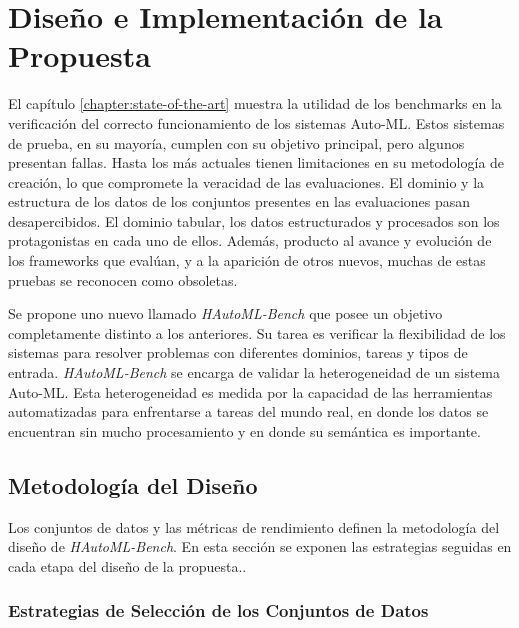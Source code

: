 \chapter{Diseño e Implementación de la Propuesta}\label{chapter:design}


El capítulo \ref{chapter:state-of-the-art} muestra la utilidad de los benchmarks en la verificación del correcto funcionamiento de los sistemas Auto-ML.
Estos sistemas de prueba, en su mayoría, cumplen con su objetivo principal, pero algunos presentan fallas. Hasta los más actuales 
tienen limitaciones en su metodología de creación, lo que compromete la veracidad de las evaluaciones. 
El dominio y la estructura de los datos de los conjuntos presentes en las evaluaciones pasan desapercibidos.
El dominio tabular, los datos estructurados y procesados son los protagonistas en cada uno de ellos. 
Además, producto al avance y evolución de los frameworks que evalúan, y a la aparición de otros nuevos, muchas de estas pruebas se reconocen como obsoletas. 

Se propone uno nuevo llamado \textit{HAutoML-Bench} que posee un objetivo completamente distinto a los anteriores. Su tarea es verificar la flexibilidad de los 
sistemas para resolver problemas con diferentes dominios, tareas y tipos de entrada. \textit{HAutoML-Bench} se encarga de validar la heterogeneidad de un sistema 
Auto-ML. Esta heterogeneidad es medida por la capacidad de las herramientas automatizadas para enfrentarse a tareas del mundo real, en donde los datos se encuentran 
sin mucho procesamiento y en donde su semántica es importante.


\section{Metodología del Diseño }\label{section:design}

Los conjuntos de datos y las métricas de rendimiento definen la metodología del diseño de \textit{HAutoML-Bench}. En esta sección se exponen las estrategias seguidas 
en cada etapa del diseño de la propuesta.. 

\subsection{Estrategias de Selección de los Conjuntos de Datos}\label{subsection:selection}

